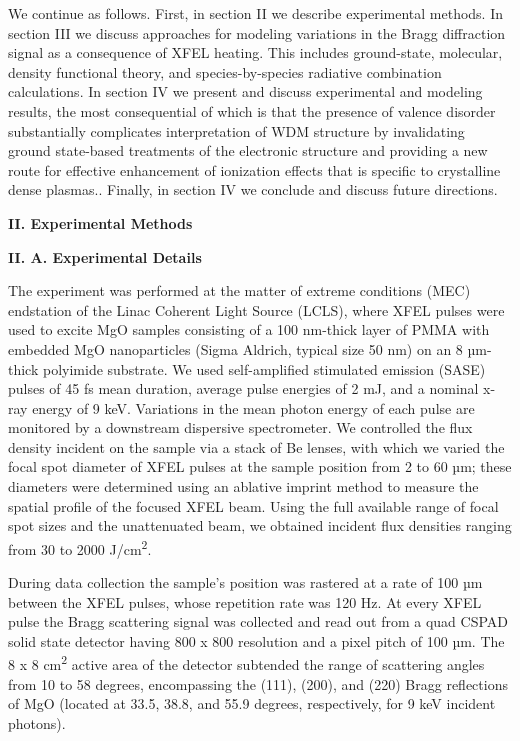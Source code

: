 We continue as follows. First, in section II we describe experimental
methods. In section III we discuss approaches for modeling variations in
the Bragg diffraction signal as a consequence of XFEL heating. This
includes ground-state, molecular, density functional theory, and
species-by-species radiative combination calculations. In section IV we
present and discuss experimental and modeling results, the most
consequential of which is that the presence of valence disorder
substantially complicates interpretation of WDM structure by
invalidating ground state-based treatments of the electronic structure
and providing a new route for effective enhancement of ionization
effects that is specific to crystalline dense plasmas.. Finally, in
section IV we conclude and discuss future directions.

\textbf{II. Experimental Methods}

\textbf{II. A. Experimental Details}

The experiment was performed at the matter of extreme conditions (MEC)
endstation of the Linac Coherent Light Source (LCLS), where XFEL pulses
were used to excite MgO samples consisting of a 100 nm-thick layer of
PMMA with embedded MgO nanoparticles (Sigma Aldrich, typical size 50 nm)
on an 8 µm-thick polyimide substrate. We used self-amplified stimulated
emission (SASE) pulses of 45 fs mean duration, average pulse energies of
2 mJ, and a nominal x-ray energy of 9 keV. Variations in the mean photon
energy of each pulse are monitored by a downstream dispersive
spectrometer. We controlled the flux density incident on the sample via
a stack of Be lenses, with which we varied the focal spot diameter of
XFEL pulses at the sample position from 2 to 60 µm; these diameters were
determined using an ablative imprint method to measure the spatial
profile of the focused XFEL beam.  Using the full available
range of focal spot sizes and the unattenuated beam, we obtained
incident flux densities ranging from 30 to 2000 J/cm\textsuperscript{2}.

During data collection the sample's position was rastered at a rate of
100 µm between the XFEL pulses, whose repetition rate was 120 Hz. At
every XFEL pulse the Bragg scattering signal was collected and read out
from a quad CSPAD solid state detector having 800 x 800 resolution and a
pixel pitch of 100 µm. \cite{hart2012cspad} The 8 x 8 cm\textsuperscript{2}
active area of the detector subtended the range of scattering angles
from 10 to 58 degrees, encompassing the (111), (200), and (220) Bragg
reflections of MgO (located at 33.5, 38.8, and 55.9 degrees,
respectively, for 9 keV incident photons).

